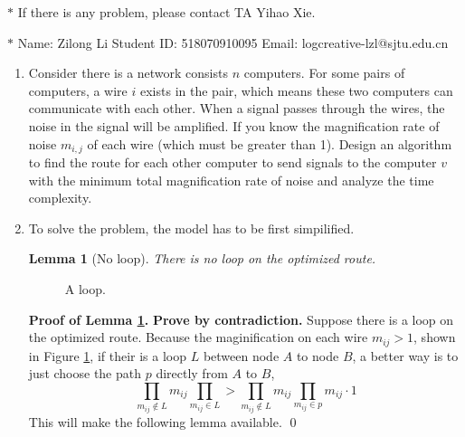 \documentclass[12pt,a4paper]{article}
\makeatletter
\newtheorem{lemma}[theorem]{Lemma}
\newtheorem*{solution}{Solution}
\theoremstyle{definition}
\renewenvironment{solution}[1][Solution] {\par\pushQED{\qed}\normalfont\topsep6\p@\@plus6\p@\relax\trivlist\item[\hskip\labelsep\bfseries#1\@addpunct{.}]\ignorespaces}{\popQED\endtrivlist\@endpefalse} \makeatother
\makeatother
\begin{document}
\noindent

\noindent{}
\begin{center}
\footnotesize{\color{red}$*$ If there is any problem, please contact TA Yihao Xie. }

\footnotesize{\color{blue}$*$ Name: Zilong Li  \quad Student ID: 518070910095 \quad Email: logcreative-lzl@sjtu.edu.cn}
\end{center}

\begin{enumerate}
    \item  Consider there is a network consists $n$ computers. For some pairs of computers, a wire $i$ exists in the pair, which means these two computers can communicate with each other. When a signal passes through the wires, the noise in the signal will be amplified. If you know the magnification rate of noise $m_{i,j}$ of each wire (which must be greater than 1). Design an algorithm to find the route for each other computer to send signals to the computer $v$ with the minimum total magnification rate of noise and analyze the time complexity.
    
	\begin{solution}
		To solve the problem, the model has to be first simpilified.
		\begin{lemma}[No loop]\label{lem:nl}
			There is no loop on the optimized route.
		\end{lemma}

		\begin{figure}[h]
			\centering
			
			\caption{A loop.}
			\label{fig:lp}
		\end{figure}

		\textbf{Proof of Lemma \ref{lem:nl}.} \textbf{Prove by contradiction.} Suppose there is a loop on the optimized route. Because the maginification on each wire $m_{ij}>1$, shown in Figure \ref{fig:lp}, if their is a loop $L$ between node $A$ to node $B$, a better way is to just choose the path $p$ directly from $A$ to $B$,
		\begin{equation*}
			\prod_{m_{ij}\not\in L} m_{ij} \prod_{m_{ij}\in L} > \prod_{m_{ij}\not\in L} m_{ij} \prod_{m_{ij}\in p} m_{ij} \cdot 1
		\end{equation*}
		This will make the following lemma available.
		\hfil \qed \vspace{\parskip}


\end{solution}
\end{enumerate}
\end{document}
